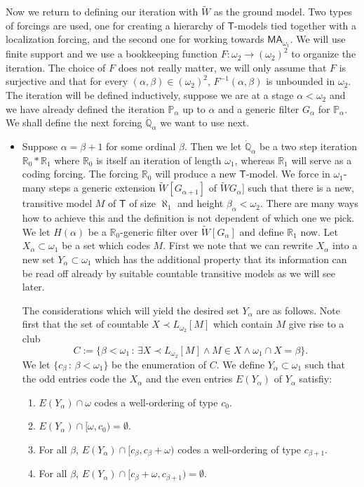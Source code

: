 \documentclass[a4paper,12pt]{article}
\newcommand{\forceP}{\mathbb{P}}
\newcommand{\forceQ}{\mathbb{Q}}
\newcommand{\forceR}{\mathbb{R}}
\newcommand{\MA}{\mathsf{MA}_{\omega_1}}
\newcommand{\T}{\mathsf{T}}
\begin{document}
Now we return to defining our iteration with $\tilde{W}$ as the ground model.
Two types of forcings are used, one for creating a hierarchy of $\T$-models tied together with a localization forcing, and the second one for working towards $\MA$. We will use finite support and we use a bookkeeping function $F: \omega_2 \rightarrow (\omega_2)^2$ to organize the iteration. The choice of $F$ does not really matter, we will only assume that $F$ is surjective and that for every $(\alpha,\beta) \in (\omega_2)^2$, $F^{-1} (\alpha,\beta)$ is unbounded in $\omega_2$.
The iteration will be defined inductively, suppose we are at a stage $\alpha < \omega_2$ and we have already defined the iteration $\forceP_{\alpha}$ up to $\alpha$ and a generic filter $G_{\alpha}$ for $\forceP_{\alpha}$. We shall define the next forcing $\dot{\forceQ}_{\alpha}$ we want to use next.
\begin{itemize}
\item Suppose $\alpha=\beta+1$ for some ordinal $\beta$. Then we let $\dot{\forceQ}_{\alpha}$ be a two step iteration $\forceR_0 \ast \forceR_1$ where $\forceR_0$ is itself an iteration of length $\omega_1$, whereas $\forceR_1$ will serve as a coding forcing. 
The forcing $\forceR_0$ will produce a new $\T$-model. We force in $\omega_1$-many steps a generic extension $\tilde{W}[G_{\alpha+1}]$ of $\tilde{W}G_{\alpha}]$ such that there is a new, transitive model $M$ of $\T$ of size $\aleph_1$ and height $\beta_{\alpha} < \omega_2$. There are many ways how to achieve this and the definition is not dependent of which one we pick. We let $H(\alpha)$ be a $\forceR_0$-generic filter over $\tilde{W}[G_{\alpha}]$ and define $\forceR_1$ now. Let $X_{\alpha} \subset \omega_1$ be a set which codes $M$. First we note that we can rewrite $X_{\alpha}$ into a new set $Y_{\alpha} \subset \omega_1$ which has the additional property that its information can be read off already by suitable countable transitive models as we will see later.

The considerations which will yield the desired set $Y_{\alpha}$ are as follows. Note first that the set of countable $X \prec L_{\omega_2} [M]$ which contain $M$ give rise to a club 
\[C:= \{ \beta < \omega_1 \, : \, \exists X \prec L_{\omega_2}[M] \land M \in X \land \omega_1 \cap X =\beta \}. \] 
We let $\{c_{\beta} \,: \, \beta < \omega_1\}$ be the enumeration of $C$.
We define $Y_{\alpha} \subset \omega_1$ such that the odd entries code the $X_{\alpha}$ and the even entries $E(Y_{\alpha})$ of $Y_{\alpha}$ satisfiy:
\begin{enumerate}
\item $E(Y_{\alpha}) \cap \omega$ codes a well-ordering of type $c_0$.
\item $E(Y_{\alpha}) \cap [\omega, c_0) = \emptyset$.
\item For all $\beta$, $E(Y_{\alpha}) \cap [c_{\beta}, c_{\beta} + \omega)$ codes a well-ordering of type $c_{\beta+1}$.
\item For all $\beta$, $E(Y_{\alpha}) \cap [c_{\beta}+\omega, c_{\beta+1})= \emptyset$.
\end{enumerate}


\end{itemize}
\end{document}
